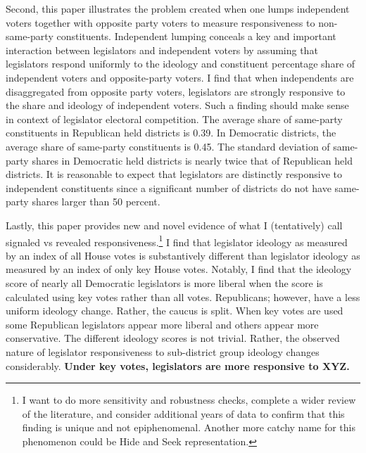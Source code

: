 \documentclass[10pt,letterpaper]{article}
\begin{document}
Second, this paper illustrates the problem created when one lumps independent voters together with opposite party voters to measure responsiveness to non-same-party constituents. Independent lumping conceals a key and important interaction between legislators and independent voters by assuming that legislators respond uniformly to the ideology and constituent percentage share of independent voters and opposite-party voters. I find that when independents are disaggregated from opposite party voters, legislators are strongly responsive to the share and ideology of independent voters. Such a finding should make sense in context of legislator electoral competition. The average share of same-party constituents in Republican held districts is 0.39. In Democratic districts, the average share of same-party constituents is 0.45. The standard deviation of same-party shares in Democratic held districts is nearly twice that of Republican held districts. It is reasonable to expect that legislators are distinctly responsive to independent constituents since a significant number of districts do not have same-party shares larger than 50 percent.

Lastly, this paper provides new and novel evidence of what I (tentatively) call signaled vs revealed responsiveness.\footnote{I want to do more sensitivity and robustness checks, complete a wider review of the literature, and consider additional years of data to confirm that this finding is unique and not epiphenomenal. Another more catchy name for this phenomenon could be Hide and Seek representation.} I find that legislator ideology as measured by an index of all House votes is substantively different than legislator ideology as measured by an index of only key House votes. Notably, I find that the ideology score of nearly all Democratic legislators is more liberal when the score is calculated using key votes rather than all votes. Republicans; however, have a less uniform ideology change. Rather, the caucus is split. When key votes are used some Republican legislators appear more liberal and others appear more conservative. The different ideology scores is not trivial. Rather, the observed nature of legislator responsiveness to sub-district group ideology changes considerably. \textbf{Under key votes, legislators are more responsive to XYZ.}
\end{document}
